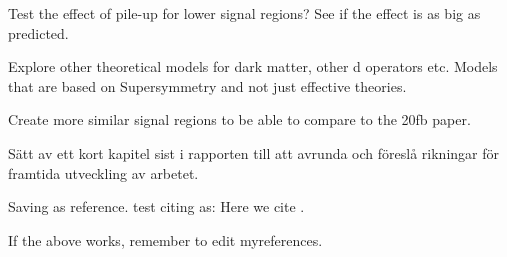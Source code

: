 Test the effect of pile-up for lower signal regions? See if the effect is as big as predicted. 

Explore other theoretical models for dark matter, other d operators etc. Models that are based on Supersymmetry and not just effective theories.

Create more similar signal regions to be able to compare to the 20fb paper. 


Sätt av ett kort kapitel sist i rapporten till att avrunda och föreslå rikningar för framtida utveckling av arbetet.


Saving as reference.
test citing as: Here we cite \citet{Duck:2005} \citep{Duck:2005}.

If the above works, remember to edit myreferences.
